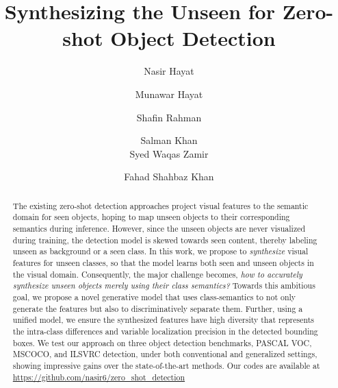 \documentclass[runningheads]{llncs}
\begin{document}
\pagestyle{headings}
\mainmatter

\def\ACCV20SubNumber{591}  

\title{Synthesizing the Unseen for Zero-shot Object Detection} 
\author{Nasir Hayat \and
Munawar Hayat \and
Shafin Rahman \and
Salman Khan \\
Syed Waqas Zamir  \and
Fahad Shahbaz Khan  
}





\maketitle






\begin{abstract}
The existing zero-shot detection approaches project visual features to the semantic domain for seen objects, hoping to map unseen objects to their corresponding semantics during inference. However, since the unseen objects are never visualized during training, the detection model is skewed towards seen content, thereby labeling unseen as background or a seen class. In this work, we propose to \emph{synthesize} visual features for unseen classes, so that the model learns both seen and unseen objects in the visual domain. Consequently, the major challenge becomes, \emph{how to accurately synthesize unseen objects merely using their class semantics?} Towards this ambitious goal, we propose a novel generative model that uses class-semantics to not only generate the features but also to discriminatively separate them. Further, using a unified model, we ensure the synthesized features have high diversity that represents the intra-class differences and variable localization precision in the detected bounding boxes. We test our approach on three object detection benchmarks, PASCAL VOC, MSCOCO, and ILSVRC detection, under both conventional and generalized settings, showing impressive gains over the state-of-the-art methods. Our codes are available at \url{https://github.com/nasir6/zero_shot_detection}
\end{abstract}
\end{document}
